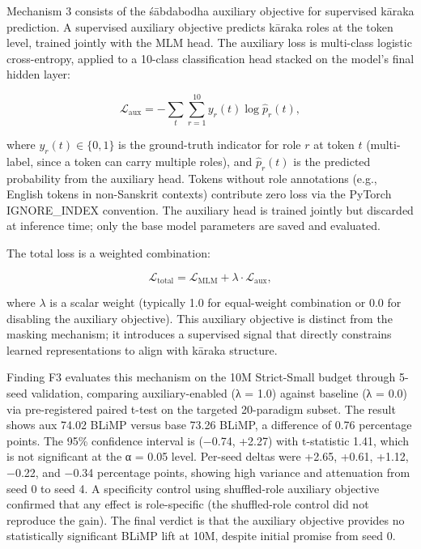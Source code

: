 Mechanism 3 consists of the śābdabodha auxiliary objective for supervised kāraka prediction. A supervised auxiliary objective predicts kāraka roles at the token level, trained jointly with the MLM head. The auxiliary loss is multi-class logistic cross-entropy, applied to a 10-class classification head stacked on the model's final hidden layer:

\begin{equation}
\mathcal{L}_{\text{aux}} = -\sum_{t} \sum_{r=1}^{10} y_r(t) \log \hat{p}_r(t),
\end{equation}

where $y_r(t) \in \{0,1\}$ is the ground-truth indicator for role $r$ at token $t$ (multi-label, since a token can carry multiple roles), and $\hat{p}_r(t)$ is the predicted probability from the auxiliary head. Tokens without role annotations (e.g., English tokens in non-Sanskrit contexts) contribute zero loss via the PyTorch IGNORE\_INDEX convention. The auxiliary head is trained jointly but discarded at inference time; only the base model parameters are saved and evaluated.

The total loss is a weighted combination:

\begin{equation}
\mathcal{L}_{\text{total}} = \mathcal{L}_{\text{MLM}} + \lambda \cdot \mathcal{L}_{\text{aux}},
\end{equation}

where $\lambda$ is a scalar weight (typically 1.0 for equal-weight combination or 0.0 for disabling the auxiliary objective). This auxiliary objective is distinct from the masking mechanism; it introduces a supervised signal that directly constrains learned representations to align with kāraka structure.

Finding F3 evaluates this mechanism on the 10M Strict-Small budget through 5-seed validation, comparing auxiliary-enabled (λ = 1.0) against baseline (λ = 0.0) via pre-registered paired t-test on the targeted 20-paradigm subset. The result shows aux 74.02 BLiMP versus base 73.26 BLiMP, a difference of 0.76 percentage points. The 95\% confidence interval is (−0.74, +2.27) with t-statistic 1.41, which is not significant at the α = 0.05 level. Per-seed deltas were +2.65, +0.61, +1.12, −0.22, and −0.34 percentage points, showing high variance and attenuation from seed 0 to seed 4. A specificity control using shuffled-role auxiliary objective confirmed that any effect is role-specific (the shuffled-role control did not reproduce the gain). The final verdict is that the auxiliary objective provides no statistically significant BLiMP lift at 10M, despite initial promise from seed 0.

